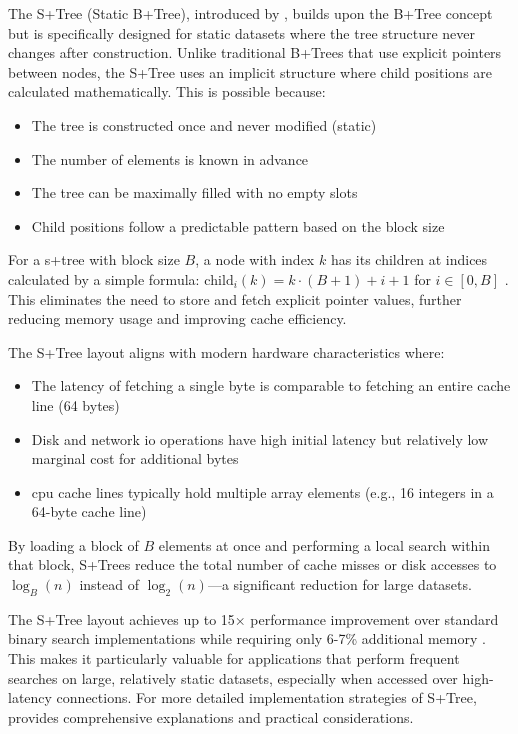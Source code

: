 The S+Tree (Static B+Tree), introduced by \citet{static_b_trees}, builds upon the B+Tree concept but is specifically designed for static datasets where the tree structure never changes after construction. Unlike traditional B+Trees that use explicit pointers between nodes, the S+Tree uses an implicit structure where child positions are calculated mathematically.
This is possible because:
\begin{itemize}
  \item The tree is constructed once and never modified (static)
  \item The number of elements is known in advance
  \item The tree can be maximally filled with no empty slots
  \item Child positions follow a predictable pattern based on the block size
\end{itemize}

For a \ac{s+tree} with block size $B$, a node with index $k$ has its children at indices calculated by a simple formula: $\text{child}_i(k) = k \cdot (B+1) + i + 1$ for $i \in [0, B]$ \citep{static_b_trees}. This eliminates the need to store and fetch explicit pointer values, further reducing memory usage and improving cache efficiency.

The S+Tree layout aligns with modern hardware characteristics where:
\begin{itemize}
  \item The latency of fetching a single byte is comparable to fetching an entire cache line (64 bytes)
  \item Disk and network \ac{io} operations have high initial latency but relatively low marginal cost for additional bytes
  \item \ac{cpu} cache lines typically hold multiple array elements (e.g., 16 integers in a 64-byte cache line)
\end{itemize}

By loading a block of $B$ elements at once and performing a local search within that block, S+Trees reduce the total number of cache misses or disk accesses to $\log_B(n)$ instead of $\log_2(n)$—a significant reduction for large datasets.

The S+Tree layout achieves up to 15× performance improvement over standard binary search implementations while requiring only 6-7\% additional memory \citep{static_b_trees}. This makes it particularly valuable for applications that perform frequent searches on large, relatively static datasets, especially when accessed over high-latency connections. For more detailed implementation strategies of S+Tree, \citet{koerkamp_2024} provides comprehensive explanations and practical considerations.
